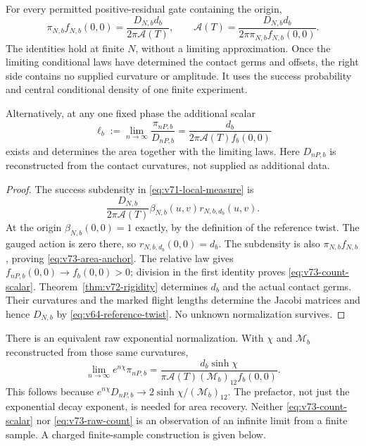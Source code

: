 \begin{proposition}\label{prop:v73-area-anchor}
For every permitted positive-residual gate containing the origin,
\begin{equation}\label{eq:v73-area-anchor}
 \pi_{N,b}f_{N,b}(0,0)
   =\frac{D_{N,b}d_b}{2\pi\mathcal A(T)},\qquad
 \mathcal A(T)=\frac{D_{N,b}d_b}
 {2\pi\pi_{N,b}f_{N,b}(0,0)}.
\end{equation}
The identities hold at finite $N$, without a limiting approximation.
Once the limiting conditional laws have determined the contact germs
and offsets, the right side contains no supplied curvature or amplitude.
It uses the success probability and central conditional density of one
finite experiment.

Alternatively, at any one fixed phase the additional scalar
\begin{equation}\label{eq:v73-count-scalar}
 \ell_b:=\lim_{n\to\infty}\frac{\pi_{nP,b}}{D_{nP,b}}
       =\frac{d_b}{2\pi\mathcal A(T)f_b(0,0)}
\end{equation}
exists and determines the area together with the limiting laws.  Here
$D_{nP,b}$ is reconstructed from the contact curvatures, not supplied as
additional data.
\end{proposition}
\begin{proof}
The success subdensity in \eqref{eq:v71-local-measure} is
\[
 \frac{D_{N,b}}{2\pi\mathcal A(T)}
       \beta_{N,b}(u,v)r_{N,b,d_b}(u,v).
\]
At the origin $\beta_{N,b}(0,0)=1$ exactly, by the definition of the
reference twist.  The gauged action is zero there, so
$r_{N,b,d_b}(0,0)=d_b$.  The subdensity is also
$\pi_{N,b}f_{N,b}$, proving \eqref{eq:v73-area-anchor}.
The relative law gives $f_{nP,b}(0,0)\to f_b(0,0)>0$; division in
the first identity proves \eqref{eq:v73-count-scalar}.
Theorem~\ref{thm:v72-rigidity} determines $d_b$ and the actual contact
germs.  Their curvatures and the marked flight lengths determine the
Jacobi matrices and hence $D_{N,b}$ by
\eqref{eq:v64-reference-twist}.  No unknown normalization survives.
\end{proof}

There is an equivalent raw exponential normalization.  With $\chi$ and
$\mathcal M_b$ reconstructed from those same curvatures,
\begin{equation}\label{eq:v73-raw-count}
 \lim_{n\to\infty} e^{n\chi}\pi_{nP,b}
 =\frac{d_b\sinh\chi}
 {\pi\mathcal A(T)(\mathcal M_b)_{12}f_b(0,0)}.
\end{equation}
This follows because $e^{n\chi}D_{nP,b}\to
2\sinh\chi/(\mathcal M_b)_{12}$.  The prefactor, not just the
exponential decay exponent, is needed for area recovery.  Neither
\eqref{eq:v73-count-scalar} nor \eqref{eq:v73-raw-count} is an
observation of an infinite limit from a finite sample.  A charged
finite-sample construction is given below.

